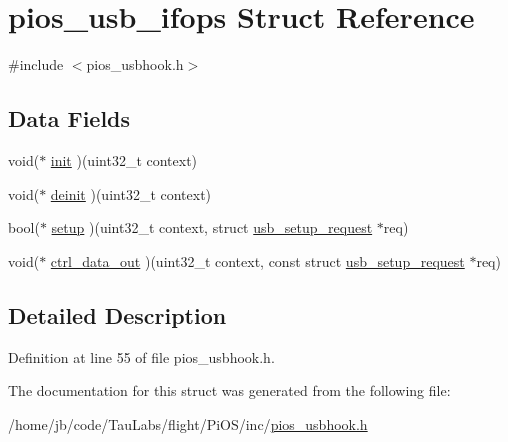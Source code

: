 \hypertarget{structpios__usb__ifops}{\section{pios\-\_\-usb\-\_\-ifops \-Struct \-Reference}
\label{structpios__usb__ifops}
}


{\ttfamily \#include $<$pios\-\_\-usbhook.\-h$>$}

\subsection*{\-Data \-Fields}
\begin{DoxyCompactItemize}
\item 
void($\ast$ \hyperlink{group___p_i_o_s___u_s_b_h_o_o_k_ga08614658e728cfb81cb4091e3e210624}{init} )(uint32\-\_\-t context)
\item 
void($\ast$ \hyperlink{group___p_i_o_s___u_s_b_h_o_o_k_ga23c8bc133e24838b490c81a9d47318d4}{deinit} )(uint32\-\_\-t context)
\item 
bool($\ast$ \hyperlink{group___p_i_o_s___u_s_b_h_o_o_k_gafc58e776c6ff79a3974ca6dc1decf467}{setup} )(uint32\-\_\-t context, struct \hyperlink{structusb__setup__request}{usb\-\_\-setup\-\_\-request} $\ast$req)
\item 
void($\ast$ \hyperlink{group___p_i_o_s___u_s_b_h_o_o_k_ga7fce932d233ec743f190170b5b277746}{ctrl\-\_\-data\-\_\-out} )(uint32\-\_\-t context, const struct \hyperlink{structusb__setup__request}{usb\-\_\-setup\-\_\-request} $\ast$req)
\end{DoxyCompactItemize}


\subsection{\-Detailed \-Description}


\-Definition at line 55 of file pios\-\_\-usbhook.\-h.



\-The documentation for this struct was generated from the following file\-:\begin{DoxyCompactItemize}
\item 
/home/jb/code/\-Tau\-Labs/flight/\-Pi\-O\-S/inc/\hyperlink{pios__usbhook_8h}{pios\-\_\-usbhook.\-h}\end{DoxyCompactItemize}
